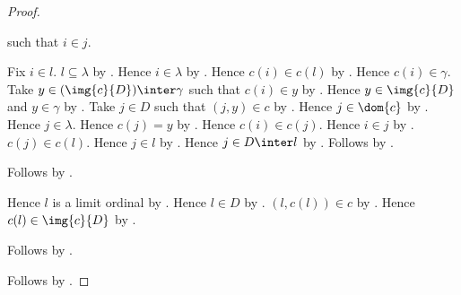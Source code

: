 \begin{proof}
\begin{subproof}
\begin{subproof}
\begin{subproof}
                    such that $i\in j$.
                \begin{subproof}
                    Fix $i\in l$.
                    $l\subseteq\lambda$
                        by .
                    Hence $i\in\lambda$ by .
                    Hence $c(i)\in c(l)$
                        by .
                    Hence $c(i)\in\gamma$.
                    Take $y\in(\img{c}{D})\inter\gamma$ such that
                        $c(i)\in y$ by .
                    Hence $y\in\img{c}{D}$ and $y\in\gamma$
                        by .
                    Take $j\in D$ such that $(j,y)\in c$
                        by .
                    Hence $j\in\dom{c}$ by .
                    Hence $j\in\lambda$.
                    Hence $c(j)=y$ by .
                    Hence $c(i)\in c(j)$.
                    Hence $i\in j$
                        by .
                    $c(j)\in c(l)$.
                    Hence $j\in l$
                        by .
                    Hence $j\in D\inter l$ by .
                    Follows by \auto.
                \end{subproof}
                Follows by .
            \end{subproof}
            Hence $l$ is a limit ordinal
                by .
            Hence $l\in D$ by .
            $(l,c(l))\in c$ by .
            Hence $c(l)\in\img{c}{D}$ by .
        \end{subproof}
        Follows by .
    \end{subproof}
    Follows by .
\end{proof}


